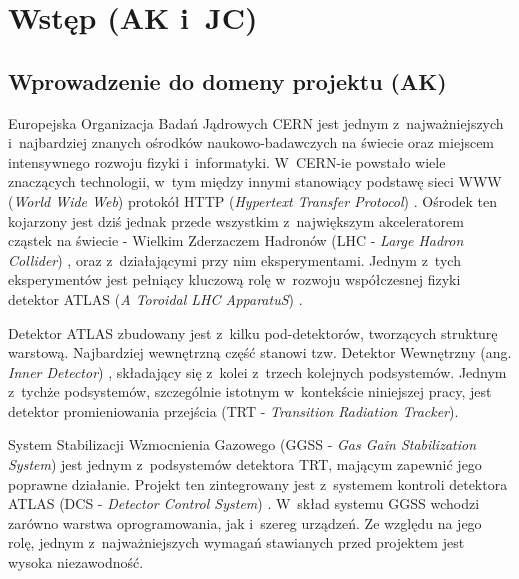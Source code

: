 \chapter{Wstęp (AK i~JC)}
\label{cha:wstep}

\section{Wprowadzenie do domeny projektu (AK)}

Europejska Organizacja Badań Jądrowych CERN jest jednym z~najważniejszych i~najbardziej znanych ośrodków naukowo-badawczych na świecie oraz miejscem intensywnego rozwoju fizyki i~informatyki. W~CERN-ie powstało wiele znaczących technologii, w~tym między innymi stanowiący podstawę sieci WWW (\emph{World Wide Web}) \cite{WWW_wikipedia} protokół HTTP (\emph{Hypertext Transfer Protocol}) \cite{HTTP_wikipedia}. Ośrodek ten kojarzony jest dziś jednak przede wszystkim z~największym akceleratorem cząstek na świecie - Wielkim Zderzaczem Hadronów (LHC - \emph{Large Hadron Collider}) \cite{LHC_cern}, oraz z~działającymi przy nim eksperymentami. Jednym z~tych eksperymentów jest pełniący kluczową rolę w~rozwoju współczesnej fizyki detektor ATLAS (\emph{A Toroidal LHC ApparatuS}) \cite{ATLAS_cern}.

Detektor ATLAS zbudowany jest z~kilku pod-detektorów, tworzących strukturę warstową. Najbardziej wewnętrzną część stanowi tzw. Detektor Wewnętrzny (ang. \emph{Inner Detector}) \cite{ATLAS_agh}, składający się z~kolei z~trzech kolejnych podsystemów. Jednym z~tychże podsystemów, szczególnie istotnym w~kontekście niniejszej pracy, jest detektor promieniowania przejścia (TRT - \emph{Transition Radiation Tracker}).

System Stabilizacji Wzmocnienia Gazowego (GGSS - \emph{Gas Gain Stabilization System}) \cite{GGSS_jinst} jest jednym z~podsystemów detektora TRT, mającym zapewnić jego poprawne działanie. Projekt ten zintegrowany jest z~systemem kontroli detektora ATLAS (DCS - \emph{Detector Control System}) \cite{ATLAS_agh}. W~skład systemu GGSS wchodzi zarówno warstwa oprogramowania, jak i~szereg urządzeń. Ze względu na jego rolę, jednym z~najważniejszych wymagań stawianych przed projektem jest wysoka niezawodność.

